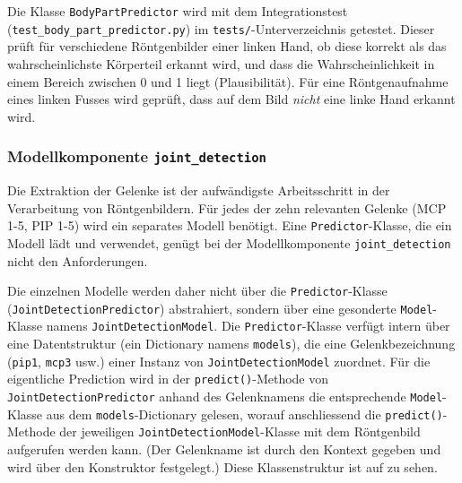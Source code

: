 Die Klasse \texttt{BodyPartPredictor} wird mit dem Integrationstest (\texttt{test\_body\_part\_pre\-dic\-tor.py}) im \texttt{tests/}-Unterverzeichnis getestet. Dieser prüft für verschiedene Röntgenbilder einer linken Hand, ob diese korrekt als das wahrscheinlichste Körperteil erkannt wird, und dass die Wahrscheinlichkeit in einem Bereich zwischen 0 und 1 liegt (Plausibilität). Für eine Röntgenaufnahme eines linken Fusses wird geprüft, dass auf dem Bild \textit{nicht} eine linke Hand erkannt wird.

\subsubsection{Modellkomponente \texttt{joint\_detection}}

Die Extraktion der Gelenke ist der aufwändigste Arbeitsschritt in der Verarbeitung von Röntgenbildern. Für jedes der zehn relevanten Gelenke (MCP 1-5, PIP 1-5) wird ein separates Modell benötigt. Eine \texttt{Predictor}-Klasse, die ein Modell lädt und verwendet, genügt bei der Modellkomponente \texttt{joint\_detection} nicht den Anforderungen.

Die einzelnen Modelle werden daher nicht über die \texttt{Predictor}-Klasse (\texttt{JointDetection\-Predictor}) abstrahiert, sondern über eine gesonderte \texttt{Model}-Klasse namens \texttt{Joint\-De\-tec\-tion\-Model}. Die \texttt{Predictor}-Klasse verfügt intern über eine Datentstruktur (ein Dictionary namens \texttt{models}), die eine Gelenkbezeichnung (\texttt{pip1}, \texttt{mcp3} usw.) einer Instanz von \texttt{Joint\-De\-tectionModel} zuordnet. Für die eigentliche Prediction wird in der \texttt{predict()}-Methode von \texttt{Joint\-De\-tec\-tion\-Predictor} anhand des Gelenknamens die entsprechende \texttt{Model}-Klas\-se aus dem \texttt{models}-Dictionary gelesen, worauf anschliessend die \texttt{predict()}-Methode der jeweiligen \texttt{Joint\-De\-tec\-tion\-Model}-Klasse mit dem Röntgenbild aufgerufen werden kann. (Der Gelenkname ist durch den Kontext gegeben und wird über den Konstruktor festgelegt.) Diese Klassenstruktur ist auf  zu sehen.

